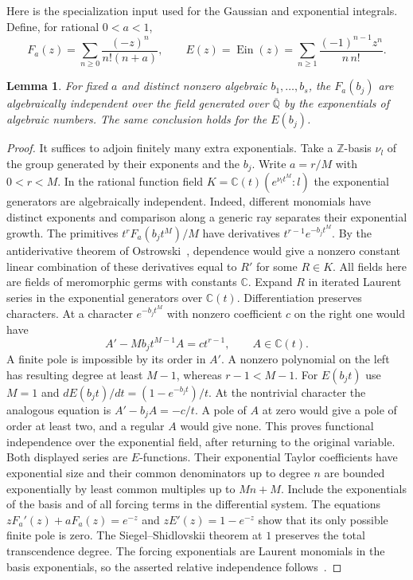 \documentclass[11pt,a4paper]{article}
\newtheorem{lemma}[theorem]{Lemma}
\theoremstyle{definition}
\theoremstyle{remark}
\begin{document}
Here is the specialization input used for the Gaussian and exponential
integrals. Define, for rational $0<a<1$,
\[
 F_a(z)=\sum_{n\ge0}\frac{(-z)^n}{n!(n+a)},\qquad
 E(z)=\operatorname{Ein}(z)=\sum_{n\ge1}\frac{(-1)^{n-1}z^n}{n\,n!}.
\]
\begin{lemma}\label{lem:analytic-multipoint}
For fixed $a$ and distinct nonzero algebraic $b_1,\ldots,b_s$,
the $F_a(b_j)$ are algebraically independent over the field generated
over $\overline{\mathbb Q}$ by the exponentials of algebraic numbers.
The same conclusion holds for the $E(b_j)$.
\end{lemma}
\begin{proof}
It suffices to adjoin finitely many extra exponentials. Take a
$\mathbb Z$-basis $\nu_l$ of the group generated by their exponents and
the $b_j$. Write $a=r/M$ with $0<r<M$. In the rational function field
$K=\mathbb C(t)(e^{\nu_lt^M}:l)$ the exponential generators are
algebraically independent. Indeed, different monomials have distinct
exponents and comparison along a generic ray separates their exponential
growth. The primitives $t^rF_a(b_jt^M)/M$ have derivatives
$t^{r-1}e^{-b_jt^M}$. By the antiderivative theorem of
Ostrowski~\cite{aOst}, dependence would give a nonzero constant linear
combination of these derivatives equal to $R'$ for some $R\in K$.
All fields here are fields of meromorphic germs with constants $\mathbb C$.
Expand $R$ in iterated Laurent series in the exponential generators over
$\mathbb C(t)$. Differentiation preserves characters. At a character
$e^{-b_jt^M}$ with nonzero coefficient $c$ on the right one would have
\[
 A'-Mb_jt^{M-1}A=c t^{r-1},\qquad A\in\mathbb C(t).
\]
A finite pole is impossible by its order in $A'$. A nonzero polynomial
on the left has resulting degree at least $M-1$, whereas $r-1<M-1$.
For $E(b_jt)$ use $M=1$ and $dE(b_jt)/dt=(1-e^{-b_jt})/t$.
At the nontrivial character the analogous equation is $A'-b_jA=-c/t$.
A pole of $A$ at zero would give a pole of order at least two, and a
regular $A$ would give none. This proves functional independence over
the exponential field, after returning to the original variable.
Both displayed series are $E$-functions. Their exponential Taylor
coefficients have exponential size and their common denominators up to
degree $n$ are bounded exponentially by least common multiples up to
$Mn+M$. Include the exponentials of the basis and of all forcing terms
in the differential system. The equations
$zF_a'(z)+aF_a(z)=e^{-z}$ and $zE'(z)=1-e^{-z}$ show that its only
possible finite pole is zero. The Siegel--Shidlovskii theorem at $1$
preserves the total transcendence degree. The forcing exponentials are
Laurent monomials in the basis exponentials, so the asserted relative
independence follows~\cite{aBeu}.
\end{proof}
\end{document}
